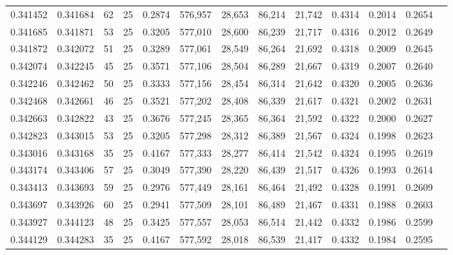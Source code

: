 \begin{tabular}{rrrrrrrrrrrrr}
0.341452 & 0.341684 &    62 &  25 &                                     0.2874 & 576,957 &  28,653 &  86,214 &  21,742 & 0.4314 & 0.2014 & 0.2654 \\
0.341685 & 0.341871 &    53 &  25 &                                     0.3205 & 577,010 &  28,600 &  86,239 &  21,717 & 0.4316 & 0.2012 & 0.2649 \\
0.341872 & 0.342072 &    51 &  25 &                                     0.3289 & 577,061 &  28,549 &  86,264 &  21,692 & 0.4318 & 0.2009 & 0.2645 \\
0.342074 & 0.342245 &    45 &  25 &                                     0.3571 & 577,106 &  28,504 &  86,289 &  21,667 & 0.4319 & 0.2007 & 0.2640 \\
0.342246 & 0.342462 &    50 &  25 &                                     0.3333 & 577,156 &  28,454 &  86,314 &  21,642 & 0.4320 & 0.2005 & 0.2636 \\
0.342468 & 0.342661 &    46 &  25 &                                     0.3521 & 577,202 &  28,408 &  86,339 &  21,617 & 0.4321 & 0.2002 & 0.2631 \\
0.342663 & 0.342822 &    43 &  25 &                                     0.3676 & 577,245 &  28,365 &  86,364 &  21,592 & 0.4322 & 0.2000 & 0.2627 \\
0.342823 & 0.343015 &    53 &  25 &                                     0.3205 & 577,298 &  28,312 &  86,389 &  21,567 & 0.4324 & 0.1998 & 0.2623 \\
0.343016 & 0.343168 &    35 &  25 &                                     0.4167 & 577,333 &  28,277 &  86,414 &  21,542 & 0.4324 & 0.1995 & 0.2619 \\
0.343174 & 0.343406 &    57 &  25 &                                     0.3049 & 577,390 &  28,220 &  86,439 &  21,517 & 0.4326 & 0.1993 & 0.2614 \\
0.343413 & 0.343693 &    59 &  25 &                                     0.2976 & 577,449 &  28,161 &  86,464 &  21,492 & 0.4328 & 0.1991 & 0.2609 \\
0.343697 & 0.343926 &    60 &  25 &                                     0.2941 & 577,509 &  28,101 &  86,489 &  21,467 & 0.4331 & 0.1988 & 0.2603 \\
0.343927 & 0.344123 &    48 &  25 &                                     0.3425 & 577,557 &  28,053 &  86,514 &  21,442 & 0.4332 & 0.1986 & 0.2599 \\
0.344129 & 0.344283 &    35 &  25 &                                     0.4167 & 577,592 &  28,018 &  86,539 &  21,417 & 0.4332 & 0.1984 & 0.2595 \\

\end{tabular}
